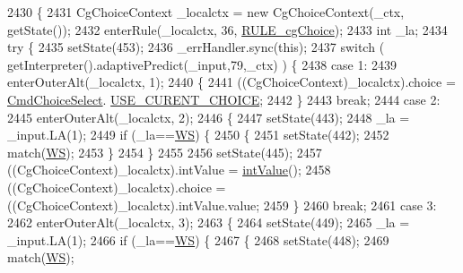 \begin{DoxyCode}
2430                                                                       \{
2431     CgChoiceContext \_localctx = \textcolor{keyword}{new} CgChoiceContext(\_ctx, getState());
2432     enterRule(\_localctx, 36, \hyperlink{classgov_1_1nasa_1_1jpf_1_1inspector_1_1client_1_1parser_1_1_console_grammar_parser_addd65ad3cc6d7379a2a88ca83408524e}{RULE\_cgChoice});
2433     \textcolor{keywordtype}{int} \_la;
2434     \textcolor{keywordflow}{try} \{
2435       setState(453);
2436       \_errHandler.sync(\textcolor{keyword}{this});
2437       \textcolor{keywordflow}{switch} ( getInterpreter().adaptivePredict(\_input,79,\_ctx) ) \{
2438       \textcolor{keywordflow}{case} 1:
2439         enterOuterAlt(\_localctx, 1);
2440         \{
2441          ((CgChoiceContext)\_localctx).choice =  \hyperlink{classgov_1_1nasa_1_1jpf_1_1inspector_1_1client_1_1commands_1_1_cmd_choice_select}{CmdChoiceSelect}.
      \hyperlink{classgov_1_1nasa_1_1jpf_1_1inspector_1_1client_1_1commands_1_1_cmd_choice_select_a0b120ead5754a831aeb7021179e9ab9f}{USE\_CURENT\_CHOICE}; 
2442         \}
2443         \textcolor{keywordflow}{break};
2444       \textcolor{keywordflow}{case} 2:
2445         enterOuterAlt(\_localctx, 2);
2446         \{
2447         setState(443);
2448         \_la = \_input.LA(1);
2449         \textcolor{keywordflow}{if} (\_la==\hyperlink{classgov_1_1nasa_1_1jpf_1_1inspector_1_1client_1_1parser_1_1_console_grammar_parser_a6914a3a3adbc350b12a7df9d1b24abf1}{WS}) \{
2450           \{
2451           setState(442);
2452           match(\hyperlink{classgov_1_1nasa_1_1jpf_1_1inspector_1_1client_1_1parser_1_1_console_grammar_parser_a6914a3a3adbc350b12a7df9d1b24abf1}{WS});
2453           \}
2454         \}
2455 
2456         setState(445);
2457         ((CgChoiceContext)\_localctx).intValue = \hyperlink{classgov_1_1nasa_1_1jpf_1_1inspector_1_1client_1_1parser_1_1_console_grammar_parser_a132b5d5236398d90d8d1e6b16dc0bd20}{intValue}();
2458          ((CgChoiceContext)\_localctx).choice =  ((CgChoiceContext)\_localctx).intValue.value; 
2459         \}
2460         \textcolor{keywordflow}{break};
2461       \textcolor{keywordflow}{case} 3:
2462         enterOuterAlt(\_localctx, 3);
2463         \{
2464         setState(449);
2465         \_la = \_input.LA(1);
2466         \textcolor{keywordflow}{if} (\_la==\hyperlink{classgov_1_1nasa_1_1jpf_1_1inspector_1_1client_1_1parser_1_1_console_grammar_parser_a6914a3a3adbc350b12a7df9d1b24abf1}{WS}) \{
2467           \{
2468           setState(448);
2469           match(\hyperlink{classgov_1_1nasa_1_1jpf_1_1inspector_1_1client_1_1parser_1_1_console_grammar_parser_a6914a3a3adbc350b12a7df9d1b24abf1}{WS});

\end{DoxyCode}
